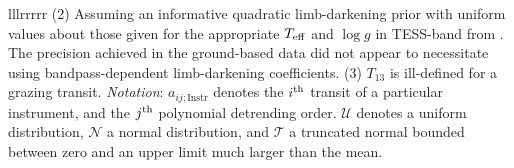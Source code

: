 \begin{deluxetable*}{lllrrrrr}
{%
%
(2) Assuming an informative quadratic limb-darkening prior with
uniform values about those given for the appropriate $T_{\rm eff}$ and
$\log g$ in TESS-band from \citet{claret_limb_2017}.  The precision
achieved in the ground-based data did not appear to necessitate using
bandpass-dependent limb-darkening coefficients.
(3) $T_{13}$ is ill-defined for a grazing transit.
{\it Notation}:
$a_{ij;\mathrm{Instr}}$ denotes the $i^{\rm th}$ transit of a
particular instrument, and the $j^{\rm th}$ polynomial detrending
order.
$\mathcal{U}$ denotes a uniform distribution,
$\mathcal{N}$ a normal distribution, and
$\mathcal{T}$ a truncated normal bounded between zero and an upper limit much larger than the mean.
}
\vspace{0cm}
\end{deluxetable*}
